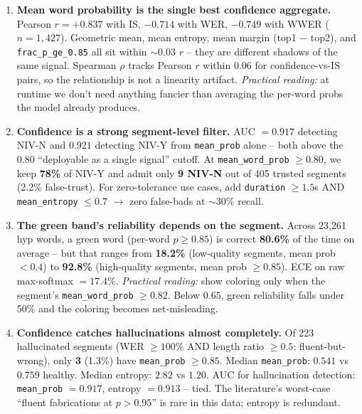 \documentclass[11pt, a4paper]{article}
\begin{document}
\begin{enumerate}[leftmargin=*]

\item \textbf{Mean word probability is the single best confidence aggregate.} Pearson $r = +0.837$ with IS, $-0.714$ with WER, $-0.749$ with WWER ($n = 1{,}427$). Geometric mean, mean entropy, mean margin (top1 $-$ top2), and \texttt{frac\_p\_ge\_0.85} all sit within $\sim 0.03$ $r$ -- they are different shadows of the same signal. Spearman $\rho$ tracks Pearson $r$ within $0.06$ for confidence-vs-IS pairs, so the relationship is not a linearity artifact. \emph{Practical reading:} at runtime we don't need anything fancier than averaging the per-word probs the model already produces.

\item \textbf{Confidence is a strong segment-level filter.} AUC $= 0.917$ detecting NIV-N and $0.921$ detecting NIV-Y from \texttt{mean\_prob} alone -- both above the $0.80$ ``deployable as a single signal'' cutoff. At \texttt{mean\_word\_prob} $\ge 0.80$, we keep \textbf{78\%} of NIV-Y and admit only \textbf{9 NIV-N} out of 405 trusted segments (2.2\% false-trust). For zero-tolerance use cases, add \texttt{duration} $\ge 1.5$s AND \texttt{mean\_entropy} $\le 0.7$ $\to$ zero false-bads at $\sim 30\%$ recall.

\item \textbf{The green band's reliability depends on the segment.} Across 23{,}261 hyp words, a green word (per-word $p \ge 0.85$) is correct \textbf{80.6\%} of the time on average -- but that ranges from \textbf{18.2\%} (low-quality segments, mean prob $< 0.4$) to \textbf{92.8\%} (high-quality segments, mean prob $\ge 0.85$). ECE on raw max-softmax $= 17.4\%$. \emph{Practical reading:} show coloring only when the segment's \texttt{mean\_word\_prob} $\ge 0.82$. Below $0.65$, green reliability falls under 50\% and the coloring becomes net-misleading.

\item \textbf{Confidence catches hallucinations almost completely.} Of 223 hallucinated segments (WER $\ge 100\%$ AND length ratio $\ge 0.5$: fluent-but-wrong), only \textbf{3} (1.3\%) have \texttt{mean\_prob} $\ge 0.85$. Median \texttt{mean\_prob}: $0.541$ vs $0.759$ healthy. Median entropy: $2.82$ vs $1.20$. AUC for hallucination detection: \texttt{mean\_prob} $= 0.917$, entropy $= 0.913$ -- tied. The literature's worst-case ``fluent fabrications at $p > 0.95$'' is rare in this data; entropy is redundant.


\end{enumerate}
\end{document}
